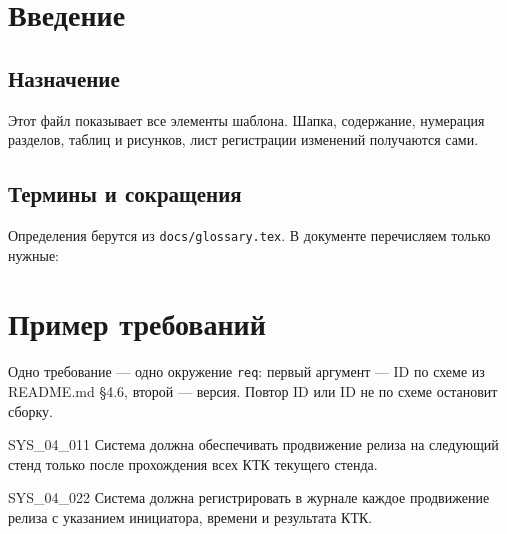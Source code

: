 \documentclass{tpks}
\begin{document}
\makeheader %
\begin{changelog}
\end{changelog}

\section{Введение}

\subsection{Назначение}

Этот файл показывает все элементы шаблона. Шапка, содержание, нумерация разделов, таблиц
и рисунков, лист регистрации изменений получаются сами.

\subsection{Термины и сокращения}

Определения берутся из \texttt{docs/glossary.tex}. В документе перечисляем только нужные:


\section{Пример требований}

Одно требование — одно окружение \texttt{req}: первый аргумент — ID по схеме из
README.md §4.6, второй — версия. Повтор ID или ID не по схеме остановит сборку.

\begin{req}{SYS_04_01}{1}
Система должна обеспечивать продвижение релиза на следующий стенд только после прохождения
всех КТК текущего стенда.
\end{req}

\begin{req}{SYS_04_02}{2}
Система должна регистрировать в журнале каждое продвижение релиза с указанием инициатора,
времени и результата КТК.
\end{req}
\end{document}
